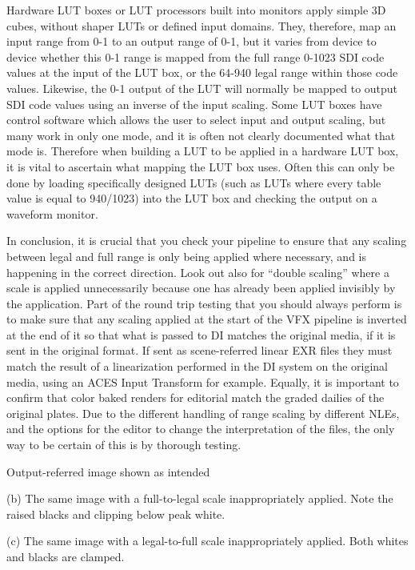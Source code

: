 Hardware LUT boxes or LUT processors built into monitors apply simple 3D cubes, without shaper LUTs or defined input domains. They, therefore, map an input range from 0-1 to an output range of 0-1, but it varies from device to device whether this 0-1 range is mapped from the full range 0-1023 SDI code values at the input of the LUT box, or the 64-940 legal range within those code values. Likewise, the 0-1 output of the LUT will normally be mapped to output SDI code values using an inverse of the input scaling. Some LUT boxes have control software which allows the user to select input and output scaling, but many work in only one mode, and it is often not clearly documented what that mode is. Therefore when building a LUT to be applied in a hardware LUT box, it is vital to ascertain what mapping the LUT box uses. Often this can only be done by loading specifically designed LUTs (such as LUTs where every table value is equal to 940/1023) into the LUT box and checking the output on a waveform monitor.

In conclusion, it is crucial that you check your pipeline to ensure that any scaling between legal and full range is only being applied where necessary, and is happening in the correct direction. Look out also for “double scaling” where a scale is applied unnecessarily because one has already been applied invisibly by the application. Part of the round trip testing that you should always perform is to make sure that any scaling applied at the start of the VFX pipeline is inverted at the end of it so that what is passed to DI matches the original media, if it is sent in the original format. If sent as scene-referred linear EXR files they must match the result of a linearization performed in the DI system on the original media, using an ACES Input Transform for example. Equally, it is important to confirm that color baked renders for editorial match the graded dailies of the original plates. Due to the different handling of range scaling by different NLEs, and the options for the editor to change the interpretation of the files, the only way to be certain of this is by thorough testing.


Output-referred image shown as intended

(b) The same image with a full-to-legal scale inappropriately applied. Note the raised blacks and clipping below peak white.


(c) The same image with a legal-to-full scale inappropriately applied. Both whites and blacks are clamped.


